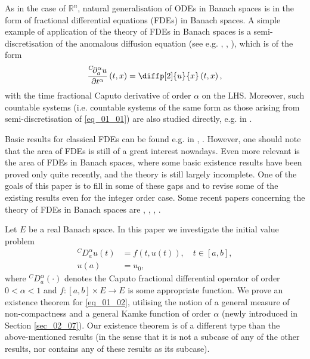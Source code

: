 \documentclass[reqno]{amsart}
\numberwithin{equation}{section}
\theoremstyle{definition}
\theoremstyle{remark}
\newcommand{\br}[1]{\left(#1\right)}
\newcommand{\DC}[3]{{}^{C}\!D^{#1}_{#2}{#3}}
\newcommand{\DCp}[4]{\frac{{}^{C}\!\partial^{#1}_{#2}{#3}}{\partial{#4}^{#1}}}
\newcommand{\R}{\mathbb{R}}
\newcommand{\sbr}[1]{\left[#1\right]}
\newcommand{\sectionRef}[1]{\textrm{Section \ref{#1}}}
\newcommand{\st}{\!:}
\begin{document}
	As in the case of $\R^n$, natural generalisation of ODEs in Banach spaces is in the form of fractional differential equations (FDEs) in Banach spaces. A simple example of application of the theory of FDEs in Banach spaces is a semi-discretisation of the anomalous diffusion equation (see e.g. \cite{Evangelista}, \cite{Meerschaert}, \cite{Metzler_Klafter}), which is of the form
	\begin{equation}\label{eq_01_01}
		\DCp{\alpha}{a}{u}{t}\br{t,x}=\diffp[2]{u}{x}\br{t,x},
	\end{equation}
	with the time fractional Caputo derivative of order $\alpha$ on the LHS. Moreover, such countable systems (i.e. countable systems of the same form as those arising from semi-discretisation of \eqref{eq_01_01}) are also studied directly, e.g. in \cite{Liu}.
	
	Basic results for classical FDEs can be found e.g. in \cite{Diethelm}, \cite{Kilbas}. However, one should note that the area of FDEs is still of a great interest nowadays. Even more relevant is the area of FDEs in Banach spaces, where some basic existence results have been proved only quite recently, and the theory is still largely incomplete. One of the goals of this paper is to fill in some of these gaps and to revise some of the existing results even for the integer order case. Some recent papers concerning the theory of FDEs in Banach spaces are \cite{Abbas}, \cite{Lakshmikantham_Devi}, \cite{Salem}, \cite{Zhou_Jiao_Pecaric}.
	
	Let $E$ be a real Banach space. In this paper we investigate the initial value problem
	\begin{subequations}\label{eq_01_02}
		\begin{align}
			\DC{\alpha}{a}{u\br{t}}&=f\br{t,u\br{t}},\quad{t}\in\sbr{a,b},\\
			u\br{a}&=u_0,
		\end{align}
	\end{subequations}
	where $\DC{\alpha}{a}{\br{\cdot}}$ denotes the Caputo fractional differential operator of order $0<\alpha<1$ and $f\st\sbr{a,b}\times{E}\rightarrow{E}$ is some appropriate function. We prove an existence theorem for \eqref{eq_01_02}, utilising the notion of a general measure of non-compactness and a general Kamke function of order $\alpha$ (newly introduced in \sectionRef{sec_02_07}). Our existence theorem is of a different type than the above-mentioned results (in the sense that it is not a subcase of any of the other results, nor contains any of these results as its subcase). 
	
\end{document}
